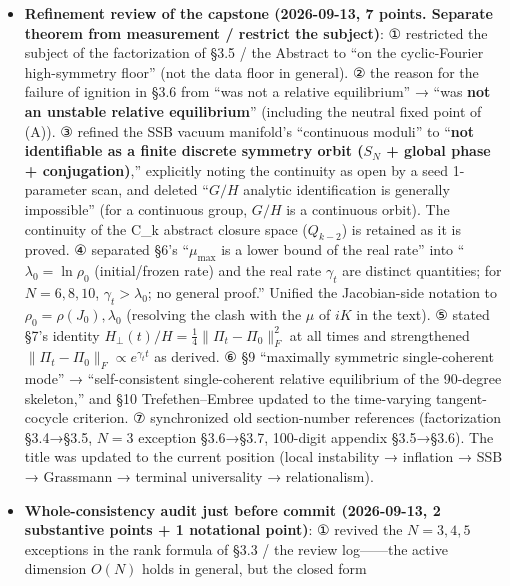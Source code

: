 \documentclass[
  a4paper,
]{ltjsarticle}
\begin{document}
\begin{itemize}
  and the 2000-step inflation + terminal complex for N=22/40 (Figures
  5c--5f). Appendix B was expanded into a reproducibility table of
  ``figures, generating programs, relative paths'' and the bulk-upload
  policy upon publication was stated.
\item
  \textbf{Refinement review of the capstone (2026-09-13, 7 points.
  Separate theorem from measurement / restrict the subject)}: ①
  restricted the subject of the factorization of §3.5 / the Abstract to
  ``on the cyclic-Fourier high-symmetry floor'' (not the data floor in
  general). ② the reason for the failure of ignition in §3.6 from ``was
  not a relative equilibrium'' → ``was \textbf{not an unstable relative
  equilibrium}'' (including the neutral fixed point of (A)). ③ refined
  the SSB vacuum manifold's ``continuous moduli'' to ``\textbf{not
  identifiable as a finite discrete symmetry orbit (\(S_N\) + global
  phase + conjugation)},'' explicitly noting the continuity as open by a
  seed 1-parameter scan, and deleted ``\(G/H\) analytic identification
  is generally impossible'' (for a continuous group, \(G/H\) is a
  continuous orbit). The continuity of the C\_k abstract closure space
  (\(Q_{k-2}\)) is retained as it is proved. ④ separated §6's
  ``\(\mu_{\max}\) is a lower bound of the real rate'' into
  ``\(\lambda_0=\ln\rho_0\) (initial/frozen rate) and the real rate
  \(\gamma_t\) are distinct quantities; for \(N=6,8,10\),
  \(\gamma_t>\lambda_0\); no general proof.'' Unified the Jacobian-side
  notation to \(\rho_0=\rho(J_0),\lambda_0\) (resolving the clash with
  the \(\mu\) of \(iK\) in the text). ⑤ stated §7's identity
  \(H_\perp(t)/H=\tfrac14\|\Pi_t-\Pi_0\|_F^2\) at all times and
  strengthened \(\|\Pi_t-\Pi_0\|_F\propto e^{\gamma_t t}\) as derived. ⑥
  §9 ``maximally symmetric single-coherent mode'' → ``self-consistent
  single-coherent relative equilibrium of the 90-degree skeleton,'' and
  §10 Trefethen--Embree updated to the time-varying tangent-cocycle
  criterion. ⑦ synchronized old section-number references (factorization
  §3.4→§3.5, \(N=3\) exception §3.6→§3.7, 100-digit appendix §3.5→§3.6).
  The title was updated to the current position (local instability →
  inflation → SSB → Grassmann → terminal universality → relationalism).
\item
  \textbf{Whole-consistency audit just before commit (2026-09-13, 2
  substantive points + 1 notational point)}: ① revived the \(N=3,4,5\)
  exceptions in the rank formula of §3.3 / the review log------the
  active dimension \(O(N)\) holds in general, but the closed form

\end{itemize}
\end{document}
